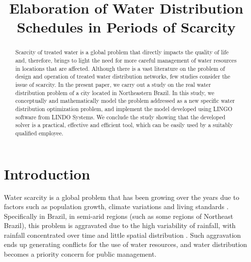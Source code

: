 \documentclass{singlecol}
\theoremstyle{TH}{
\newtheorem{lemma}{Lemma}
\newtheorem{theorem}[lemma]{Theorem}
\newtheorem{corrolary}[lemma]{Corrolary}
\newtheorem{conjecture}[lemma]{Conjecture}
\newtheorem{proposition}[lemma]{Proposition}
\newtheorem{claim}[lemma]{Claim}
\newtheorem{stheorem}[lemma]{Wrong Theorem}
\newtheorem{algorithm}{Algorithm}
}
\theoremstyle{THrm}{
\newtheorem{definition}{Definition}[section]
\newtheorem{question}{Question}[section]
\newtheorem{remark}{Remark}
\newtheorem{scheme}{Scheme}
}
\theoremstyle{THhit}{
\newtheorem{case}{Case}[section]
}
\begin{document}
%

\setcounter{page}{1}






\BottomCatch

\CLline

\subtitle{}

\title{Elaboration of Water Distribution Schedules in Periods of Scarcity}

\begin{abstract}

Scarcity of treated water is a global problem that directly impacts the quality of life and, therefore, brings to light the need for more careful management of water resources in locations that are affected. Although there is a vast literature on the problem of design and operation of treated water distribution networks, few studies consider the issue of scarcity. In the present paper, we carry out a study on the real water distribution problem of a city located in Northeastern Brazil. In this study, we conceptually and mathematically model the problem addressed as a new specific water distribution optimization problem, and implement the model developed using LINGO software from LINDO Systems. We conclude the study showing that the developed solver is a practical, effective and efficient tool, which can be easily used by a suitably qualified employee.
\end{abstract}


\maketitle


 \section{Introduction}

Water scarcity is a global problem that has been growing over the years due to factors such as population growth, climate variations and living standards \citep{HangEtAl2021}. Specifically in Brazil, in semi-arid regions (such as some regions of Northeast Brazil), this problem is aggravated due to the high variability of rainfall, with rainfall concentrated over time and little spatial distribution \citep{SilvaEtAl2019}. Such aggravation ends up generating conflicts for the use of water resources, and water distribution becomes a priority concern for public management.
\end{document}
